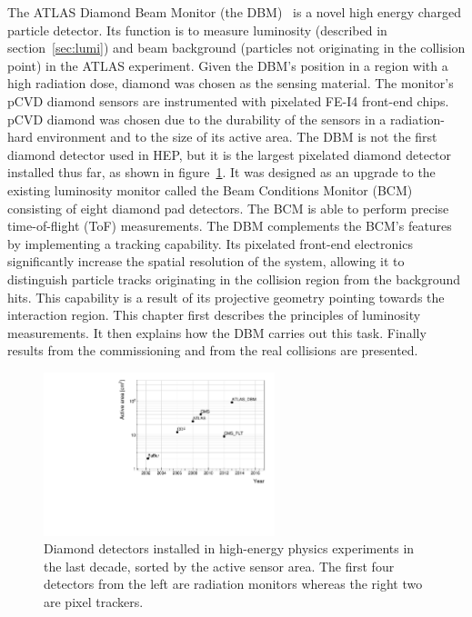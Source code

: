 The ATLAS Diamond Beam Monitor (the DBM)~\cite{Cerv:1630832} is a novel high energy charged particle detector. Its function is to measure luminosity (described in section~\ref{sec:lumi}) and beam background (particles not originating in the collision point) in the ATLAS experiment. Given the DBM's position in a region with a high radiation dose, diamond was chosen as the sensing material. The monitor's pCVD diamond sensors are instrumented with pixelated FE-I4 front-end chips. pCVD diamond was chosen due to the durability of the sensors in a radiation-hard environment and to the size of its active area. The DBM is not the first diamond detector used in HEP, but it is the largest pixelated diamond detector installed thus far, as shown in figure~\ref{fig:areavsyear}. It was designed as an upgrade to the existing luminosity monitor called the Beam Conditions Monitor (BCM)~\cite{Gorisek:1062633} consisting of eight diamond pad detectors. The BCM is able to perform precise time-of-flight (ToF) measurements. The DBM complements the BCM's features by implementing a tracking capability. Its pixelated front-end electronics significantly increase the spatial resolution of the system, allowing it to distinguish particle tracks originating in the collision region from the background hits. This capability is a result of its projective geometry pointing towards the interaction region. This chapter first describes the principles of luminosity measurements. It then explains how the DBM carries out this task. Finally results from the commissioning and from the real collisions are presented. 


\begin{figure}[!t]
\centering
\includegraphics[width=0.6\textwidth]{../scripts/04_charge_monitoring/plots/detArea}
\caption{Diamond detectors installed in high-energy physics experiments in the last decade, sorted by the active sensor area. The first four detectors from the left are radiation monitors whereas the right two are pixel trackers.}
\label{fig:areavsyear}
\end{figure}

